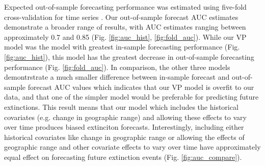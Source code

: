 \documentclass[12pt,letterpaper]{article}
\begin{document}
\begin{refsection}
Expected out-of-sample forecasting performance was estimated using five-fold cross-validation for time series \citep{Arlot2010,Bergmeir2016}. Our out-of-sample forecast AUC estimates demonstrate a broader range of results, with AUC estimates ranging between approximately 0.7 and 0.85 (Fig. \ref{fig:auc_hist}, \ref{fig:fold_auc}). While our VP model was the model with greatest in-sample forecasting performance (Fig. \ref{fig:auc_hist}), this model has the greatest decrease in out-of-sample forecasting performance (Fig. \ref{fig:fold_auc}). In comparison, the other three models demontrstrate a much smaller difference between in-sample forecast and out-of-sample forecast AUC values which indicates that our VP model is overfit to our data, and that one of the simpler model would be preferable for predicting future extinctions. This result means that our model which includes the historical covariates (e.g. change in geographic range) and allowing these effects to vary over time produces biased extinciton forecasts. Interestingly, including either historical covariates like change in geographic range or allowing the effects of geographic range and other covariate effects to vary over time have approximately equal effect on forecasting future extinction events (Fig. \ref{fig:auc_compare}). 


\end{refsection}
\end{document}
